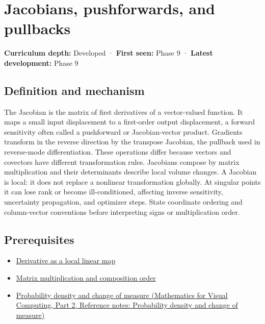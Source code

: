 \hypertarget{appendix-d8a7ddb675eb}{}\label{referencestart:appendix-d8a7ddb675eb}
\section{Jacobians, pushforwards, and pullbacks}\label{appendix-d8a7ddb675eb-jacobians-pushforwards-and-pullbacks}

\hypertarget{appendix-d8a7ddb675eb-jacobians-pushforwards-and-pullbacks}{}

\textbf{Curriculum depth:} Developed · \textbf{First seen:} Phase 9 · \textbf{Latest development:} Phase 9

\begin{allmightroledefinition}

\subsection{Definition and mechanism}\label{appendix-d8a7ddb675eb-definition-and-mechanism}

\hypertarget{appendix-d8a7ddb675eb-definition-and-mechanism}{}

The Jacobian is the matrix of first derivatives of a vector-valued function. It maps a small input displacement to a first-order output displacement, a forward sensitivity often called a pushforward or Jacobian-vector product. Gradients transform in the reverse direction by the transpose Jacobian, the pullback used in reverse-mode differentiation. These operations differ because vectors and covectors have different transformation rules. Jacobians compose by matrix multiplication and their determinants describe local volume changes. A Jacobian is local: it does not replace a nonlinear transformation globally. At singular points it can lose rank or become ill-conditioned, affecting inverse sensitivity, uncertainty propagation, and optimizer steps. State coordinate ordering and column-vector conventions before interpreting signs or multiplication order.

\end{allmightroledefinition}

\subsection{Prerequisites}\label{appendix-d8a7ddb675eb-prerequisites}

\hypertarget{appendix-d8a7ddb675eb-prerequisites}{}

\begin{itemize}
\tightlist
\item
  \hyperref[appendix-7bc181935c42]{Derivative as a local linear map}
\item
  \hyperref[appendix-ab31ef447dbf]{Matrix multiplication and composition order}
\item
  \href{../02-Mathematics-for-Visual-Computing-P02/main.pdf\#nameddest=appendix-4815cd87ab8b}{Probability density and change of measure (Mathematics for Visual Computing, Part 2, Reference notes: Probability density and change of measure)}
\end{itemize}

